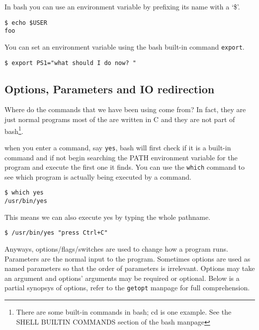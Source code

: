 \documentclass[10pt]{article}
\begin{document}
  In bash you can use an environment variable by prefixing its name with a `\$'.

\begin{verbatim}
$ echo $USER
foo
\end{verbatim}

  You can set an environment variable using the bash built-in command \texttt{export}. 

\begin{verbatim}
$ export PS1="what should I do now? "
\end{verbatim}  
  

  \subsection{Options, Parameters and IO redirection} 
  Where do the commands that we have been using come from? In fact, they are just normal programs
  most of the are written in C and they are not part of bash\footnote{There are some built-in commands in bash; cd is one example. See the SHELL BUILTIN COMMANDS section of the bash manpage }.

  when you enter a command, say \texttt{yes}, bash will first check if it is a built-in command
  and if not begin searching the PATH environment variable for the program and execute the first one it finds. You can use the \texttt{which} command to see which program is actually being executed by a command.

\begin{verbatim}
$ which yes
/usr/bin/yes
\end{verbatim}    

  This means we can also execute yes by typing the whole pathname.
  
\begin{verbatim}
$ /usr/bin/yes "press Ctrl+C"
\end{verbatim}

  Anyways, options/flags/switches are used to change how a program runs. Parameters are the normal input to the program. Sometimes options are used as named parameters so that the order of parameters is irrelevant. Options may take an argument and options' arguments may be required or optional. Below is a partial synopsys of options, refer to the \texttt{getopt} manpage for full comprehension.
\end{document}
